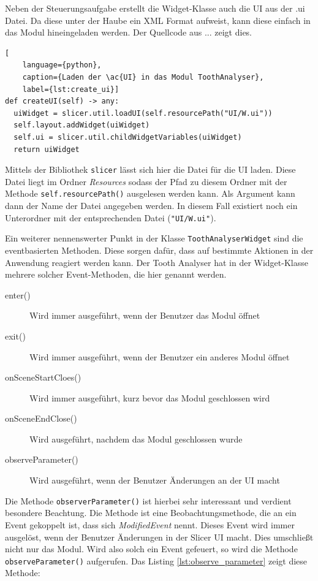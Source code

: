 Neben der Steuerungsaufgabe erstellt die Widget-Klasse auch die UI aus der .ui Datei.
Da diese unter der Haube ein XML Format aufweist, kann diese einfach in das Modul
hineingeladen werden. Der Quellcode aus ... zeigt dies.

\begin{lstlisting}[
    language={python},
    caption={Laden der \ac{UI} in das Modul ToothAnalyser},
    label={lst:create_ui}]
def createUI(self) -> any:
  uiWidget = slicer.util.loadUI(self.resourcePath("UI/W.ui"))
  self.layout.addWidget(uiWidget)
  self.ui = slicer.util.childWidgetVariables(uiWidget)
  return uiWidget
\end{lstlisting}

Mittels der Bibliothek \texttt{slicer} lässt sich hier die Datei für die \ac{UI}
laden. Diese Datei liegt im Ordner \textit{Resources} sodass der Pfad zu diesem Ordner
mit der Methode \texttt{self.resourcePath()} ausgelesen werden kann. Als Argument
kann dann der Name der Datei angegeben werden. In diesem Fall existiert noch ein
Unterordner mit der entsprechenden Datei (\texttt{"UI/W.ui"}).

Ein weiterer nennenswerter Punkt in der Klasse \texttt{ToothAnalyserWidget} sind
die eventbasierten Methoden. Diese sorgen dafür, dass auf bestimmte Aktionen in
der Anwendung reagiert werden kann. Der Tooth Analyser hat in der Widget-Klasse mehrere
solcher Event-Methoden, die hier genannt werden.

\begin{description}
	\item[enter()] Wird immer ausgeführt, wenn der Benutzer das Modul öffnet

	\item[exit()] Wird immer ausgeführt, wenn der Benutzer ein anderes Modul
		öffnet

	\item[onSceneStartCloes()] Wird immer ausgeführt, kurz bevor das Modul
		geschlossen wird

	\item[onSceneEndClose()] Wird ausgeführt, nachdem das Modul geschlossen wurde

	\item[observeParameter()] Wird ausgeführt, wenn der Benutzer Änderungen an der
		\ac{UI} macht
\end{description}

Die Methode \texttt{observerParameter()} ist hierbei sehr interessant und
verdient besondere Beachtung. Die Methode ist eine Beobachtungsmethode, die an
ein Event gekoppelt ist, dass sich \textit{ModifiedEvent} nennt. Dieses Event wird
immer ausgelöst, wenn der Benutzer Änderungen in der Slicer \ac{UI} macht. Dies
umschließt nicht nur das Modul. Wird also solch ein Event gefeuert, so wird die
Methode \texttt{observeParameter()} aufgerufen. Das Listing
\ref{lst:observe_parameter} zeigt diese Methode:

